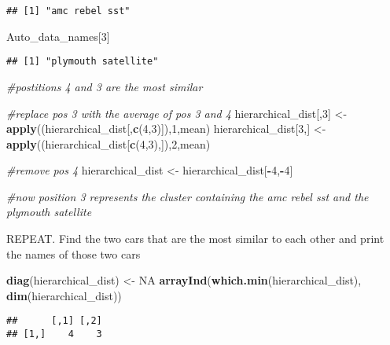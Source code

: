 \documentclass[11pt,]{article}
\newenvironment{Shaded}{\begin{snugshade}}{\end{snugshade}}
\newcommand{\CommentTok}[1]{\textcolor[rgb]{0.56,0.35,0.01}{\textit{#1}}}
\newcommand{\DecValTok}[1]{\textcolor[rgb]{0.00,0.00,0.81}{#1}}
\newcommand{\KeywordTok}[1]{\textcolor[rgb]{0.13,0.29,0.53}{\textbf{#1}}}
\newcommand{\NormalTok}[1]{#1}
\newcommand{\OperatorTok}[1]{\textcolor[rgb]{0.81,0.36,0.00}{\textbf{#1}}}
\newcommand{\OtherTok}[1]{\textcolor[rgb]{0.56,0.35,0.01}{#1}}
\newcommand{\StringTok}[1]{\textcolor[rgb]{0.31,0.60,0.02}{#1}}
\begin{document}
\begin{verbatim}
## [1] "amc rebel sst"
\end{verbatim}

\begin{Shaded}
\begin{Highlighting}[]
\NormalTok{Auto_data_names[}\DecValTok{3}\NormalTok{]}
\end{Highlighting}
\end{Shaded}

\begin{verbatim}
## [1] "plymouth satellite"
\end{verbatim}

\begin{Shaded}
\begin{Highlighting}[]
\CommentTok{#postitions 4 and 3 are the most similar}

\CommentTok{#replace pos 3 with the average of pos 3 and 4}
\NormalTok{hierarchical_dist[,}\DecValTok{3}\NormalTok{] <-}\StringTok{ }\KeywordTok{apply}\NormalTok{((hierarchical_dist[,}\KeywordTok{c}\NormalTok{(}\DecValTok{4}\NormalTok{,}\DecValTok{3}\NormalTok{)]),}\DecValTok{1}\NormalTok{,mean)}
\NormalTok{hierarchical_dist[}\DecValTok{3}\NormalTok{,] <-}\StringTok{ }\KeywordTok{apply}\NormalTok{((hierarchical_dist[}\KeywordTok{c}\NormalTok{(}\DecValTok{4}\NormalTok{,}\DecValTok{3}\NormalTok{),]),}\DecValTok{2}\NormalTok{,mean)}

\CommentTok{#remove pos 4}
\NormalTok{hierarchical_dist <-}\StringTok{ }\NormalTok{hierarchical_dist[}\OperatorTok{-}\DecValTok{4}\NormalTok{,}\OperatorTok{-}\DecValTok{4}\NormalTok{]}

\CommentTok{#now position 3 represents the cluster containing the amc rebel sst and the plymouth satellite}
\end{Highlighting}
\end{Shaded}

REPEAT. Find the two cars that are the most similar to each other and
print the names of those two cars

\begin{Shaded}
\begin{Highlighting}[]
\KeywordTok{diag}\NormalTok{(hierarchical_dist) <-}\StringTok{ }\OtherTok{NA}
\KeywordTok{arrayInd}\NormalTok{(}\KeywordTok{which.min}\NormalTok{(hierarchical_dist), }\KeywordTok{dim}\NormalTok{(hierarchical_dist))}
\end{Highlighting}
\end{Shaded}

\begin{verbatim}
##      [,1] [,2]
## [1,]    4    3
\end{verbatim}
\end{document}
